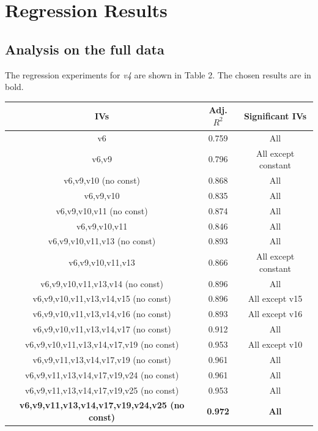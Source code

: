 \documentclass[12pt,a4paper]{article}
\begin{document}
\section{Regression Results}
\subsection{Analysis on the full data}
The regression experiments for \textit{v4} are shown in Table 2. The chosen results are in bold.\\

\begin{tabular}{|c|c|c|}
\hline 
\textbf{IVs} & \textbf{Adj. $R^2$} & \textbf{Significant IVs} \\ 
\hline 
v6 & 0.759 & All \\ 
\hline 
v6,v9 & 0.796 & All except constant \\ 
\hline 
v6,v9,v10 (no const) & 0.868 & All \\ 
\hline 
v6,v9,v10 & 0.835 & All \\ 
\hline 
v6,v9,v10,v11 (no const) & 0.874 & All \\ 
\hline 
v6,v9,v10,v11 & 0.846 & All \\ 
\hline 
v6,v9,v10,v11,v13 (no const) & 0.893 & All \\ 
\hline 
v6,v9,v10,v11,v13 & 0.866 & All except constant \\ 
\hline 
v6,v9,v10,v11,v13,v14 (no const) & 0.896 & All \\ 
\hline 
v6,v9,v10,v11,v13,v14,v15 (no const) & 0.896 & All except v15 \\ 
\hline 
v6,v9,v10,v11,v13,v14,v16 (no const) & 0.893 & All except v16 \\ 
\hline 
v6,v9,v10,v11,v13,v14,v17 (no const) & 0.912 & All \\ 
\hline 
v6,v9,v10,v11,v13,v14,v17,v19 (no const) & 0.953 & All except v10 \\ 
\hline 
v6,v9,v11,v13,v14,v17,v19 (no const) & 0.961 & All \\ 
\hline 
v6,v9,v11,v13,v14,v17,v19,v24 (no const) & 0.961 & All \\ 
\hline
v6,v9,v11,v13,v14,v17,v19,v25 (no const) & 0.953 & All \\
\hline
\textbf{v6,v9,v11,v13,v14,v17,v19,v24,v25 (no const)} & \textbf{0.972} & \textbf{All} \\
\hline 
\end{tabular}
\begingroup
{}
\endgroup
\end{document}
